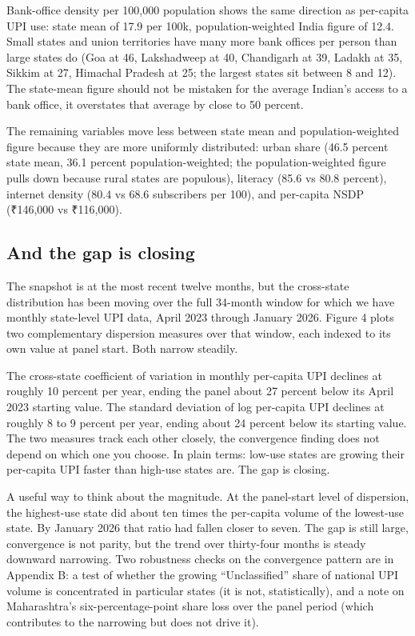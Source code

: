 \documentclass[
]{article}
\begin{document}
Bank-office density per 100,000 population shows the same direction as
per-capita UPI use: state mean of 17.9 per 100k, population-weighted
India figure of 12.4. Small states and union territories have many more
bank offices per person than large states do (Goa at 46, Lakshadweep at
40, Chandigarh at 39, Ladakh at 35, Sikkim at 27, Himachal Pradesh at
25; the largest states sit between 8 and 12). The state-mean figure
should not be mistaken for the average Indian's access to a bank office,
it overstates that average by close to 50 percent.

The remaining variables move less between state mean and
population-weighted figure because they are more uniformly distributed:
urban share (46.5 percent state mean, 36.1 percent population-weighted;
the population-weighted figure pulls down because rural states are
populous), literacy (85.6 vs 80.8 percent), internet density (80.4 vs
68.6 subscribers per 100), and per-capita NSDP (₹146,000 vs ₹116,000).

\subsection{And the gap is closing}\label{and-the-gap-is-closing}

The snapshot is at the most recent twelve months, but the cross-state
distribution has been moving over the full 34-month window for which we
have monthly state-level UPI data, April 2023 through January 2026.
Figure 4 plots two complementary dispersion measures over that window,
each indexed to its own value at panel start. Both narrow steadily.

The cross-state coefficient of variation in monthly per-capita UPI
declines at roughly 10 percent per year, ending the panel about 27
percent below its April 2023 starting value. The standard deviation of
log per-capita UPI declines at roughly 8 to 9 percent per year, ending
about 24 percent below its starting value. The two measures track each
other closely, the convergence finding does not depend on which one you
choose. In plain terms: low-use states are growing their per-capita UPI
faster than high-use states are. The gap is closing.

A useful way to think about the magnitude. At the panel-start level of
dispersion, the highest-use state did about ten times the per-capita
volume of the lowest-use state. By January 2026 that ratio had fallen
closer to seven. The gap is still large, convergence is not parity, but
the trend over thirty-four months is steady downward narrowing. Two
robustness checks on the convergence pattern are in Appendix B: a test
of whether the growing ``Unclassified'' share of national UPI volume is
concentrated in particular states (it is not, statistically), and a note
on Maharashtra's six-percentage-point share loss over the panel period
(which contributes to the narrowing but does not drive it).
\end{document}
